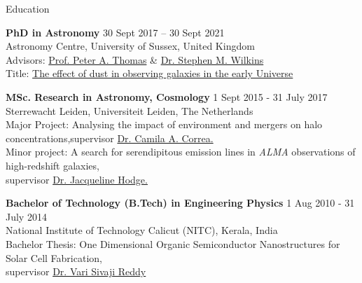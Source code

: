 \documentclass[a4paper,10pt]{resume} %
\begin{document}
\begin{rSection}{Education}

{\bf PhD in Astronomy} \hfill {30 Sept 2017 -- 30 Sept 2021}
\\ 
Astronomy Centre, University of Sussex, United Kingdom
\\
Advisors: \href{https://profiles.sussex.ac.uk/p2672-peter-thomas/about}{Prof. Peter A. Thomas} \& \href{http://stephenwilkins.co.uk/}{Dr. Stephen M. Wilkins}\\
Title: \href{https://sro.sussex.ac.uk/id/eprint/103266/}{The effect of dust in observing galaxies in the early Universe}

{\bf MSc. Research in Astronomy, Cosmology} \hfill {1 Sept 2015 - 31 July 2017}
\\ 
Sterrewacht Leiden, Universiteit Leiden, The Netherlands\\
Major Project: Analysing the impact of environment and mergers on halo concentrations,\newline supervisor \href{https://camilacorrea.com/}{Dr. Camila A. Correa.}
\\
Minor project: A search for serendipitous emission lines in \textit{ALMA} observations of high-redshift galaxies, \\supervisor \href{https://home.strw.leidenuniv.nl/~hodge/}{Dr. Jacqueline Hodge.}

{\textbf{Bachelor of Technology (B.Tech) in Engineering Physics}}  \hfill{1 Aug 2010 - 31 July 2014}\\
National Institute of Technology Calicut (NITC), Kerala, India\\
Bachelor Thesis: One Dimensional Organic Semiconductor Nanostructures for Solar Cell Fabrication, \\supervisor  \href{http://nitc.ac.in/index.php/?url=users/view/223/13/3}{Dr. Vari Sivaji Reddy}


\end{rSection} 

\end{document}
